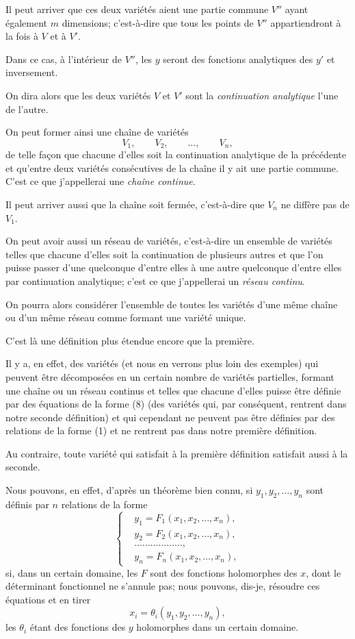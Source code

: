 \documentclass{article}
\begin{document}
Il peut arriver que ces deux variétés aient une partie commune $V''$ ayant également $m$ dimensions; c'est-à-dire que tous les points de $V''$ appartiendront à la fois à $V$ et à $V'$.

Dans ce cas, à l'intérieur de $V''$, les $y$ seront des fonctions analytiques des $y'$ et inversement.

On dira alors que les deux variétés $V$ et $V'$ sont la \emph{continuation analytique} l'une de l'autre.

On peut former ainsi une chaîne de variétés
\[
V_{1}, \qquad V_{2}, \qquad \ldots, \qquad V_{n},
\]
de telle façon que chacune d'elles soit la continuation analytique de la
précédente et qu'entre deux variétés consécutives de la chaîne il y ait une partie commune. C'est ce que j'appellerai une \emph{chaîne continue}.

Il peut arriver aussi que la chaîne soit fermée, c'est-à-dire que $V_{n}$ ne diffère pas de $V_{1}$.

On peut avoir aussi un réseau de variétés, c'est-à-dire un ensemble de variétés telles que chacune d'elles soit la continuation de plusieurs autres et que l'on puisse passer d'une quelconque d'entre elles à une autre quelconque d'entre elles par continuation analytique; c'est ce que j'appellerai un \emph{réseau continu}.

On pourra alors considérer l'ensemble de toutes les variétés d'une même chaîne ou d'un même réseau comme formant une variété unique.

C'est là une définition plus étendue encore que la première.

Il y a, en effet, des variétés (et nous en verrons plus loin des exemples) qui peuvent être décomposées en un certain nombre de variétés partielles, formant une chaîne ou un réseau continus et telles que chacune d'elles puisse être définie par des équations de la forme (8) (des variétés qui, par conséquent, rentrent dans notre seconde définition) et qui cependant ne peuvent pas être définies par des relations de la forme (1) et ne rentrent pas dans notre première définition.

Au contraire, toute variété qui satisfait à la première définition satisfait aussi à la seconde.

Nous pouvons, en effet, d'après un théorème bien connu, si $y_{1}, y_{2}, \ldots, y_{n}$ sont définis par $n$ relations de la forme
\[
\left\{
\begin{aligned}
&y_{1} = F_{1}(x_{1}, x_{2}, \ldots, x_{n}),\\
&y_{2} = F_{2}(x_{1}, x_{2}, \ldots, x_{n}),\\
&\ldots\ldots\ldots\ldots\ldots\ldots,\\
&y_{n} = F_{n}(x_{1}, x_{2}, \ldots, x_{n}),
\end{aligned}
\right.
\tag{$\alpha$}
\]
si, dans un certain domaine, les $F$ sont des fonctions holomorphes des $x$, dont le déterminant fonctionnel ne s'annule pas; nous pouvons, dis-je, résoudre ces équations et en tirer
\[
x_{i} = \theta_{i}(y_{1}, y_{2}, \ldots, y_{n}),
\tag{$\beta$}
\]
les $\theta_{i}$ étant des fonctions des $y$ holomorphes dans un certain domaine.
\end{document}
